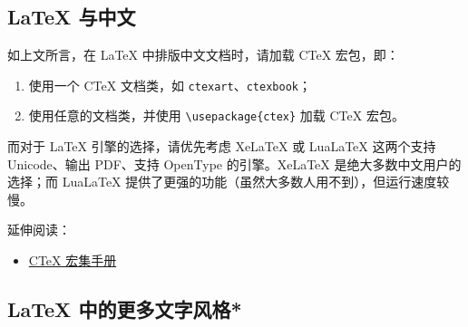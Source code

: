 \documentclass[a4paper,fontset=none]{ctexart}
\begin{document}
\subsection{LaTeX 与中文}

如上文所言，在 LaTeX 中排版中文文档时，请加载 CTeX 宏包，即：

\begin{enumerate}
    \item 使用一个 CTeX 文档类，如 \verb|ctexart|、\verb|ctexbook|；
    \item 使用任意的文档类，并使用 \verb|\usepackage{ctex}| 加载 CTeX 宏包。
\end{enumerate}

而对于 LaTeX 引擎的选择，请优先考虑 XeLaTeX 或 LuaLaTeX 这两个支持 Unicode、输出 PDF、支持 OpenType 的引擎。XeLaTeX 是绝大多数中文用户的选择；而 LuaLaTeX 提供了更强的功能（虽然大多数人用不到），但运行速度较慢。

延伸阅读：

\begin{itemize}
    \item \href{https://mirrors.ctan.org/language/chinese/ctex/ctex.pdf}{CTeX 宏集手册}
\end{itemize}

\subsection{LaTeX 中的更多文字风格*}
\end{document}
